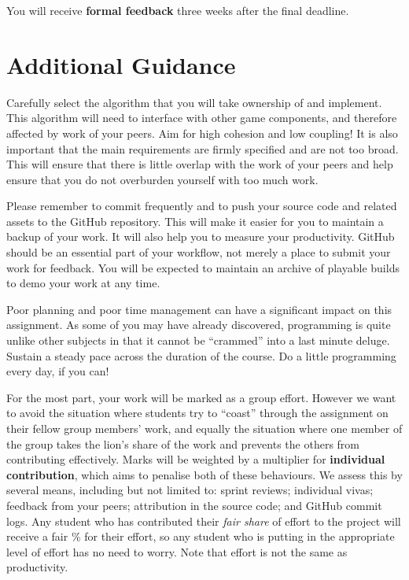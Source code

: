 \documentclass{../fal_assignment}
\begin{document}
You will receive \textbf{formal feedback} three weeks after the final deadline.

\section*{Additional Guidance}

Carefully select the algorithm that you will take ownership of and implement. This algorithm will need to interface with other game components, and therefore affected by work of your peers. Aim for high cohesion and low coupling! It is also important that the main requirements are firmly specified and are not too broad. This will ensure that there is little overlap with the work of your peers and help ensure that you do not overburden yourself with too much work. 

Please remember to commit frequently and to push your source code and related assets to the GitHub repository. This will make it easier for you to maintain a backup of your work. It will also help you to measure your productivity. GitHub should be an essential part of your workflow, not merely a place to submit your work for feedback. You will be expected to maintain an archive of playable builds to demo your work at any time.

Poor planning and poor time management can have a significant impact on this assignment. As some of you may have already discovered, programming is quite unlike other subjects in that it cannot be ``crammed'' into a last minute deluge. Sustain a steady pace across the duration of the course. Do a little programming every day, if you can!

For the most part, your work will be marked as a group effort.
However we want to avoid the situation where students try to ``coast'' through the assignment
on their fellow group members' work,
and equally the situation where one member of the group takes the lion's share of the work
and prevents the others from contributing effectively.
Marks will be weighted by a multiplier for \textbf{individual contribution},
which aims to penalise both of these behaviours.
We assess this by several means, including but not limited to: sprint reviews; individual vivas; feedback from your peers;
attribution in the source code; and GitHub commit logs.
Any student who has contributed their \textit{fair share} of effort to the project will receive a fair \% for their effort,
so any student who is putting in the appropriate level of effort has no need to worry.
Note that effort is not the same as productivity.
\end{document}
